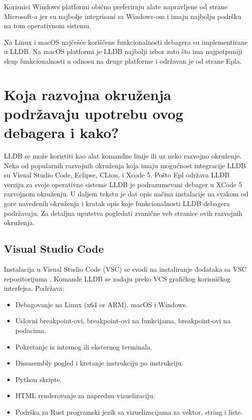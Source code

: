 \documentclass[a4paper]{article}
\begin{document}
Korisnici Windows platformi obično preferiraju alate napravljene od strane Microsoft-a jer su najbolje integrisani sa Windows-om i imaju najbolju podršku na tom operativnom sistemu.

Na Linux i macOS najčešće korišćene funkcionalnosti debagera su implementirane u LLDB. Na macOS platformi je LLDB najbolji izbor zato što ima najpotpuniji skup funkcionalnosti u odnosu na druge platforme i održavan je od strane Epla.

\section{Koja razvojna okruženja podržavaju upotrebu ovog debagera i kako?}
\label{sec:Koja razvojna okruzenja podrzavaju upotrebu ovog debagera i kako?}

LLDB se može koristiti kao alat komandne linije ili uz neko razvojno okruženje. Neka od popularnih razvojnih okruženja koja imaju mogućnost integracije LLDB su Visual Studio Code, Eclipse, CLion, i Xcode 5. Pošto Epl održava LLDB verziju za svoje operativne sisteme LLDB je podrazumevani debager u XCode 5 razvojnom okruženju. 
U daljem tekstu je dat opis načina instalacije na svakom od gore navedenih okruženja i kratak opis koje funkcionalnosti LLDB debagera podržavaju. Za detaljna uputstva pogledati zvanične veb stranice ovih razvojnih okruženja.

\subsection*{Visual Studio Code}
Instalacija u Visual Studio Code (VSC) se svodi na instaliranje dodataka sa VSC repozitorijuma \cite{visual_code_plugin}. Komande LLDB se zadaju preko VCS grafičkog korisničkog interfejsa. 
Podržava:
\begin{itemize}
\item Debagovanje na Linux (x64 or ARM), macOS i Windows.
\item Uslovni breakpoint-ovi, breakpoint-ovi na funkcijama, breakpoint-ovi na podacima.
\item Pokretanje iz internog ili eksternog terminala.
\item Dissasembly pogled i kretanje instrukciju po instrukciju.
\item Python skripte.
\item HTML renderovanje za naprednu vizuelizaciju.
\item Podrška za Rust programski jezik sa vizuelizacijama za vektor, string i liste.
\end{itemize}
\end{document}
